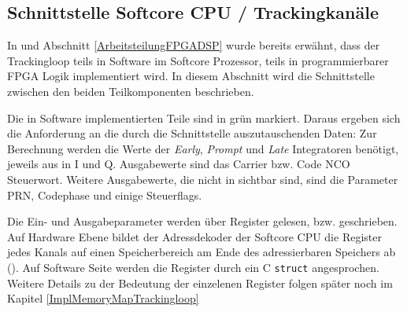 
\subsection{Schnittstelle Softcore CPU / Trackingkanäle}
In  und Abschnitt \ref{ArbeitsteilungFPGADSP} wurde bereits erwähnt, dass der Trackingloop teils in Software im Softcore Prozessor, teils in programmierbarer FPGA Logik implementiert wird. In diesem Abschnitt wird die Schnittstelle zwischen den beiden Teilkomponenten beschrieben.

Die in Software implementierten Teile sind in  grün markiert. Daraus ergeben sich die Anforderung an die durch die Schnittstelle auszutauschenden Daten: Zur Berechnung werden die Werte der \emph{Early}, \emph{Prompt} und \emph{Late} Integratoren benötigt, jeweils aus in I und Q. Ausgabewerte sind das Carrier bzw. Code NCO Steuerwort. Weitere Ausgabewerte, die nicht in  sichtbar sind, sind die Parameter PRN, Codephase und einige Steuerflags.

Die Ein- und Ausgabeparameter werden über Register gelesen, bzw. geschrieben. Auf Hardware Ebene bildet der Adressdekoder der Softcore CPU die Register jedes Kanals auf einen Speicherbereich am Ende des adressierbaren Speichers ab  (). Auf Software Seite werden die Register durch ein C \lstinline$struct$ angesprochen. Weitere Details zu der Bedeutung der einzelenen Register folgen später noch im Kapitel \ref{ImplMemoryMapTrackingloop}





